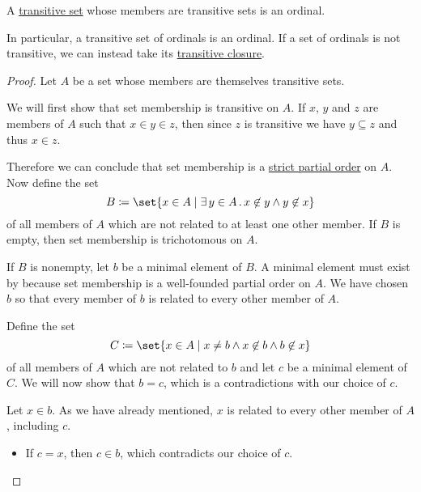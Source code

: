 \begin{proposition}\label{thm:transitive_set_of_transitive_sets_is_ordinal}
  A \hyperref[def:transitive_set]{transitive set} whose members are transitive sets is an ordinal.

  In particular, a transitive set of ordinals is an ordinal. If a set of ordinals is not transitive, we can instead take its \hyperref[def:transitive_closure_of_a_set]{transitive closure}.
\end{proposition}
\begin{proof}
  Let \( A \) be a set whose members are themselves transitive sets.

  We will first show that set membership is transitive on \( A \). If \( x \), \( y \) and \( z \) are members of \( A \) such that \( x \in y \in z \), then since \( z \) is transitive we have \( y \subseteq z \) and thus \( x \in z \).

  Therefore we can conclude that set membership is a \hyperref[def:partially_ordered_set/strict]{strict partial order} on \( A \). Now define the set
  \begin{equation*}
    B \coloneqq \set{ x \in A \given \qexists {y \in A} x \not\in y \wedge y \not\in x }
  \end{equation*}
  of all members of \( A \) which are not related to at least one other member. If \( B \) is empty, then set membership is trichotomous on \( A \).

  If \( B \) is nonempty, let \( b \) be a minimal element of \( B \). A minimal element must exist by  because set membership is a well-founded partial order on \( A \). We have chosen \( b \) so that every member of \( b \) is related to every other member of \( A \).

  Define the set
  \begin{equation*}
    C \coloneqq \set{ x \in A \given x \neq b \wedge x \not\in b \wedge b \not\in x }
  \end{equation*}
  of all members of \( A \) which are not related to \( b \) and let \( c \) be a minimal element of \( C \). We will now show that \( b = c \), which is a contradictions with our choice of \( c \).

  Let \( x \in b \). As we have already mentioned, \( x \) is related to every other member of \( A \), including \( c \).
  \begin{itemize}
    \item If \( c = x \), then \( c \in b \), which contradicts our choice of \( c \).


\end{itemize}
\end{proof}
